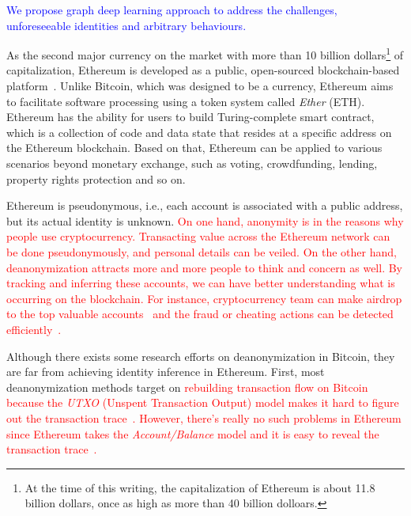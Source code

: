 \textcolor{blue}{
  We propose graph deep learning approach to address the challenges,
  unforeseeable identities and arbitrary behaviours.
}

As the second major currency on the market with more than 10 billion dollars\footnote{At the time of this writing, the capitalization of Ethereum is about 11.8 billion dollars, once as high as more than 40 billion dolloars.} of capitalization, Ethereum is developed as a public, open-sourced blockchain-based platform~\cite{buterin2013ethereum}. Unlike Bitcoin, which was designed to be a currency, Ethereum aims to facilitate software processing using a token system called \emph{Ether} (ETH). Ethereum has the ability for users to build Turing-complete smart contract, which is a collection of code and data state that resides at a specific address on the Ethereum blockchain. Based on that, Ethereum can be applied to various scenarios beyond monetary exchange, such as voting, crowdfunding, lending, property rights protection and so on.


Ethereum is pseudonymous, i.e., each account is associated with a public address, but its actual identity is unknown. \textcolor{red}{On one hand, anonymity is in the reasons why people use cryptocurrency. Transacting value across the Ethereum network can be done pseudonymously, and personal details can be veiled. On the other hand, deanonymization attracts more and more people to think and concern as well. By tracking and inferring these accounts, we can have better understanding what is occurring on the blockchain. For instance, cryptocurrency team can make airdrop to the top valuable accounts~\cite{harrigan2018airdrops} and the fraud or cheating actions can be detected efficiently~\cite{monamo2016unsupervised}.}


Although there exists some research efforts on deanonymization in Bitcoin, they are far from achieving identity inference in Ethereum. First, most deanonymization methods target on \textcolor{red}{rebuilding transaction flow on Bitcoin because the \emph{UTXO} (Unspent Transaction Output) model makes it hard to figure out the transaction trace~\cite{reid2013analysis,zhao2015graph,meiklejohn2013fistful}. However, there's really no such problems in Ethereum since Ethereum takes the \emph{Account/Balance} model and it is easy to reveal the transaction trace~\cite{buterin2013ethereum}.}

